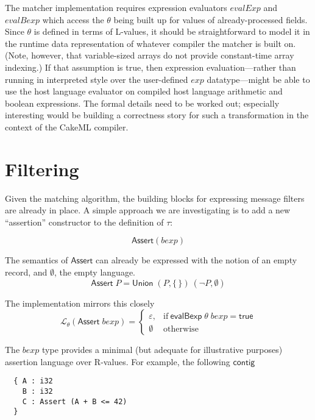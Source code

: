 \documentclass[svgnames]{llncs}
\newcommand{\konst}[1]{\ensuremath{\mathsf{#1}}}
\newcommand{\LangTheta}[1]{\ensuremath{{\mathcal L}_{\theta}({#1})}}
\begin{document}
\begin{remark}
  The matcher implementation requires expression evaluators
  $\mathit{evalExp}$ and $\mathit{evalBexp}$ which access the $\theta$
  being built up for values of already-processed fields. Since
  $\theta$ is defined in terms of L-values, it should be
  straightforward to model it in the runtime data representation of
  whatever compiler the matcher is built on. (Note, however, that
  variable-sized arrays do not provide constant-time array indexing.)
  If that assumption is true, then expression evaluation---rather than
  running in interpreted style over the user-defined $\mathit{exp}$
  datatype---might be able to use the host language evaluator on
  compiled host language arithmetic and boolean expressions. The
  formal details need to be worked out; especially interesting would
  be building a correctness story for such a transformation in the
  context of the CakeML compiler.
\end{remark}

\section{Filtering}

Given the matching algorithm, the building blocks for expressing
message filters are already in place. A simple approach we are
investigating is to add a new ``assertion'' constructor to the
definition of $\tau$:

\[
  \konst{Assert}(\mathit{bexp})
\]

\noindent The semantics of \konst{Assert} can already be expressed
with the notion of an empty record, and $\emptyset$, the empty
language.
\[\konst{Assert}\; P = \konst{Union} \; (P, \{\,\}) \ (\neg P, \emptyset) \]

\noindent The implementation mirrors this closely
\[
\LangTheta{\konst{Assert}\; \mathit{bexp}} =
 \left\{
    \begin{array}{ll}
    \varepsilon, &  \mathrm{if}\ \konst{evalBexp}\;\theta\;\mathit{bexp} = \konst{true} \\
    \emptyset & \mathrm{otherwise}
 \end{array}
 \right.
\]

The $\mathit{bexp}$ type provides a minimal (but adequate for
illustrative purposes) assertion language over R-values. For example,
the following \konst{contig}

\begin{verbatim}
  { A : i32
    B : i32
    C : Assert (A + B <= 42)
  }
\end{verbatim}
\end{document}
